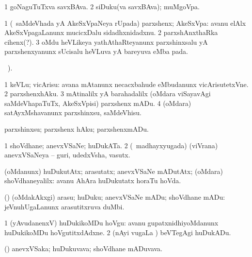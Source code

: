\bentry
{}
\gl{\nA}
\bmng
\bnum
\num{1} goNaguTuTxva savxBAva. 
\num{2} siDuku(va savxBAva); muMgoVpa. 
\enum
\emng
\eentry

\bentry
{}
\gl{\nA}
\bmng
\bnum
\num{1} (\kanmu\ saMdeVhada yA AkeSxVpaNeya rUpada) parxshenx; AkeSxVpa:  avanu elAlx AkeSxVpagaLanunx mucicxDalu sidadhxnidadxnu. 
\num{2} parxshAnxthaRka cihenx(?). 
\num{3} oMdu heVLikeya yathAthaRteyanunx parxshinxsalu yA parxshenxyanunx sUcisalu heVLuva yA bareyuva  eMba pada. 
\enum
\emng
\eentry

\bentry
{}
\gl{\kirx}
\BUkaq\ ). 

\noindent
\gl{\sakirx}
\bmng
\bnum
\num{1} keVLu; vicArisu:  avana mAtanunx necacxbahude eMbudanunx vicArisutetxVne. 
\num{2} parxshenxhAku. 
\num{3} mAtinalilx yA barahadalilx (oMdara viSayavAgi saMdeVhapaTuTx, AkeSxVpisi) parxshenx mADu. 
\num{4} (oMdara) satAyxMshavanunx parxshinxsu, saMdeVhisu. 
\enum
\emng

\noindent
\gl{\akirx}
\bmng
parxshinxsu; parxshenx hAku; parxshenxmADu. 
\emng
\eentry

\bentry
{}
\gl{\nA}
\bmng
\bnum
\num{1} shoVdhane; anevxVSaNe; huDukATa. 
\num{2} (\kanmu\ madhayxyugada) (viVrana) anevxVSaNeya -- guri, udedxVsha, vasutx. 
\enum
\emng

\noindent
\gl{\pagu}
\bmng
{} (oMdanunx) huDukutAtx; arasutatx; anevxVSaNe mADutAtx; (oMdara) shoVdhane\-yalilx:  avanu AhAra huDukutatx horaTu hoVda. 
\emng
\eentry

\bentry
{}
\gl{\sakirx}
\bmng
(\kAparx) (oMdakAkxgi) arasu; huDuku; anevxVSaNe mADu; shoVdhane mADu:  jeVnuhUgaLanunx arasutitxruva duMbi. 
\emng

\noindent
\gl{\akirx}
\expl{}
\bmng
\bnum
\num{1} (yAvudanenxV) huDukikoMDu hoVgu:  avanu gupatxnidhiyoMdanunx huDukikoMDu hoVgutitxdAdxne. 
\num{2} (nAyi \mo vugaLa \vi) beVTegAgi huDukADu. 
\enum
\emng
\eentry

\bentry
{}
\gl{\nA}
\bmng
(\kAparx) anevxVSaka; huDukuvava; shoVdhane mADuvava. 
\emng
\eentry

